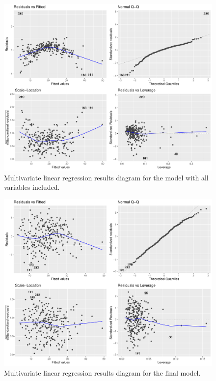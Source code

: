 \documentclass[11pt,american,american]{article}
\begin{document}
\begin{figure}[ht!]
	\centering
	\includegraphics[width=0.95\linewidth]{Images/FIGURES/multivar_linear_regression_all}
	\caption{Multivariate linear regression results diagram for the model with all variables included.}
	\label{fig:multivar_linear_regression_all}
\end{figure}
\vspace*{\fill}

\newpage

\begin{figure}[ht!]
	\centering
	\includegraphics[width=0.95\linewidth]{Images/FIGURES/multivar_linear_regression_final}
	\caption{Multivariate linear regression results diagram for the final model.}
	\label{fig:multivar_linear_regression_final}
\end{figure}
\end{document}
